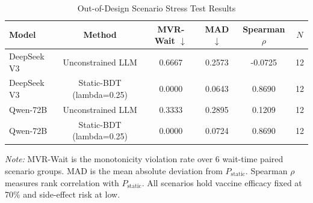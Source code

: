 \begin{table}[htbp]
\centering
\caption{Out-of-Design Scenario Stress Test Results}
\label{tab:out-of-design}
\footnotesize
\begin{tabular}{lccccc}
\toprule
Model & Method & MVR-Wait $\downarrow$ & MAD $\downarrow$ & Spearman $\rho$ & $N$ \\
\midrule
DeepSeek V3 & Unconstrained LLM & 0.6667 & 0.2573 & -0.0725 & 12 \\
DeepSeek V3 & Static-BDT (lambda=0.25) & 0.0000 & 0.0643 & 0.8690 & 12 \\
Qwen-72B & Unconstrained LLM & 0.3333 & 0.2895 & 0.1209 & 12 \\
Qwen-72B & Static-BDT (lambda=0.25) & 0.0000 & 0.0724 & 0.8690 & 12 \\
\bottomrule
\end{tabular}

\par\smallskip
\textit{Note:} MVR-Wait is the monotonicity violation rate over 6 wait-time paired scenario groups. MAD is the mean absolute deviation from $P_{\mathrm{static}}$. Spearman $\rho$ measures rank correlation with $P_{\mathrm{static}}$. All scenarios hold vaccine efficacy fixed at 70\% and side-effect risk at low.
\end{table}
